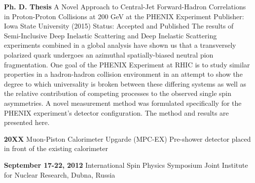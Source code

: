 \begin{paracol}{2}
\begin{rightcolumn}
\cvevent
	{\textbf{Ph. D. Thesis}}
	{A Novel Approach to Central-Jet Forward-Hadron Correlations in Proton-Proton Collisions at 200 GeV at the PHENIX Experiment}
	{Publisher: Iowa State University (2015)}
	{Status: Accepted and Published}
	{The results of Semi-Inclusive Deep Inelastic Scattering and Deep Inelastic Scattering experiments combined in a global analysis have shown us that a transversely polarized quark undergoes an azimuthal spatially-biased neutral pion fragmentation. One goal of the PHENIX Experiment at RHIC is to study similar properties in a hadron-hadron collision environment in an attempt to show the degree to which universality is broken between these differing systems as well as the relative contribution of competing processes to the observed single spin asymmetries. A novel measurement method was formulated specifically for the PHENIX experiment's detector configuration. The method and results are presented here.}
\vfill\null


\vfill\null
{}

\cvevent
	{\textbf{20XX}}
	{Muon-Piston Calorimeter Upgarde (MPC-EX)}
	{Pre-shower detector placed in front of the existing calorimeter}
	{}
\vfill\null


\vfill\null
{}

\cvevent
	{\textbf{September 17-22, 2012}}
	{International Spin Physics Symposium}
	{Joint Institute for Nuclear Research, Dubna, Russia}
	{}
\vfill\null




\vfill
\vfill
\vfill
\end{rightcolumn}
\end{paracol}

